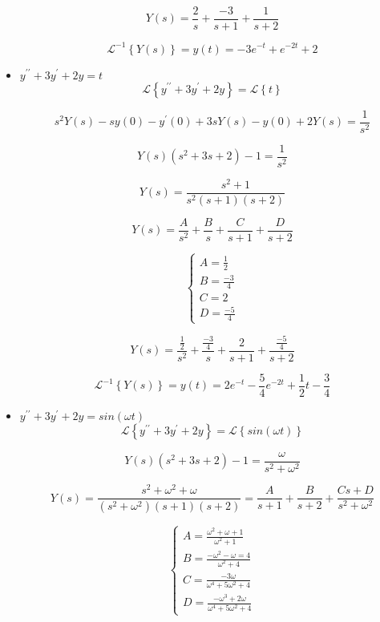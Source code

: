 \documentclass{article}
\begin{document}
\begin{itemize}
        $$Y(s)=\frac{2}{s}+\frac{-3}{s+1}+\frac{1}{s+2}$$

        $$\mathcal{L}^{-1}\left\{Y(s)\right\}=y(t)=-3e^{-t}+e^{-2t}+2$$


    \item $y^{\prime \prime}+3y^{\prime}+2y=t$
        $$\mathcal{L}\left\{y^{\prime \prime}+3y^{\prime}+2y\right\}=\mathcal{L}\left\{t\right\}$$

        $$s^{2} Y(s) -s y(0) -y^{\prime}(0) +3s Y(s) - y(0) +2 Y(s)=\frac{1}{s^{2}}$$

        $$Y(s) \left( s^{2}+3s+2 \right)-1=\frac{1}{s^{2}}$$

        $$ Y(s)= \frac{s^{2}+1}{s^{2}(s+1)(s+2)}$$

        $$ Y(s)=\frac{A}{s^{2}}+\frac{B}{s}+\frac{C}{s+1}+\frac{D}{s+2}$$

        \[\begin{cases}
            A=\frac{1}{2}
            \\
            B=\frac{-3}{4}
            \\
            C=2
            \\
            D=\frac{-5}{4}
        \end{cases}\]

        $$ Y(s)=\frac{\frac{1}{2}}{s^{2}}+\frac{\frac{-3}{4}}{s}+\frac{2}{s+1}+
            \frac{\frac{-5}{4}}{s+2}$$

        $$\mathcal{L}^{-1}\left\{Y(s)\right\}=y(t)=2e^{-t}-\frac{5}{4}e^{-2t}+\frac{1}{2}t-
            \frac{3}{4}$$


    \item $y^{\prime \prime}+3y^{\prime}+2y=sin(\omega t)$
        $$\mathcal{L}\left\{y^{\prime \prime}+3y^{\prime}+2y\right\}=
            \mathcal{L}\left\{sin(\omega t)\right\}$$

        $$Y(s)\left(s^{2}+3s+2\right)-1=\frac{\omega}{s^{2}+\omega^{2}}$$

        $$Y(s)=\frac{s^{2}+\omega^{2}+\omega}{(s^{2}+\omega^{2})(s+1)(s+2)}=\frac{A}{s+1}+
            \frac{B}{s+2}+\frac{Cs+D}{s^{2}+\omega^{2}}$$

        \[\begin{cases}
            A=\frac{\omega^{2}+\omega+1}{\omega^{2}+1}
            \\
            B=\frac{-\omega^{2}-\omega=4}{\omega^{2}+4}
            \\
            C=\frac{-3\omega}{\omega^{4}+5\omega^{2}+4}
            \\
            D=\frac{-\omega^{3}+2\omega}{\omega^{4}+5\omega^{2}+4}
        \end{cases}\]


\end{itemize}
\end{document}
